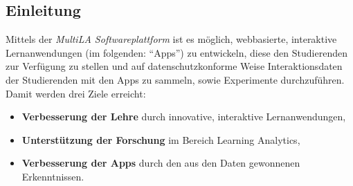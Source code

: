 \documentclass[a0,portrait]{a0poster}
\begin{document}
\vspace{1cm} %


\begin{multicols}{2} %


%
%
%


\color{black}

\section*{Einleitung}

Mittels der \textit{MultiLA Softwareplattform} ist es möglich, webbasierte, interaktive Lernanwendungen (im folgenden: \enquote{Apps}) zu entwickeln, diese den Studierenden zur Verfügung zu stellen und auf datenschutzkonforme Weise Interaktionsdaten der Studierenden mit den Apps zu sammeln, sowie Experimente durchzuführen. Damit werden drei Ziele erreicht:

\begin{itemize}
    \item \textbf{Verbesserung der Lehre} durch innovative, interaktive Lernanwendungen,
    \item \textbf{Unterstützung der Forschung} im Bereich Learning Analytics,
    \item \textbf{Verbesserung der Apps} durch den aus den Daten gewonnenen Erkenntnissen.
\end{itemize}


\end{multicols}
\end{document}
